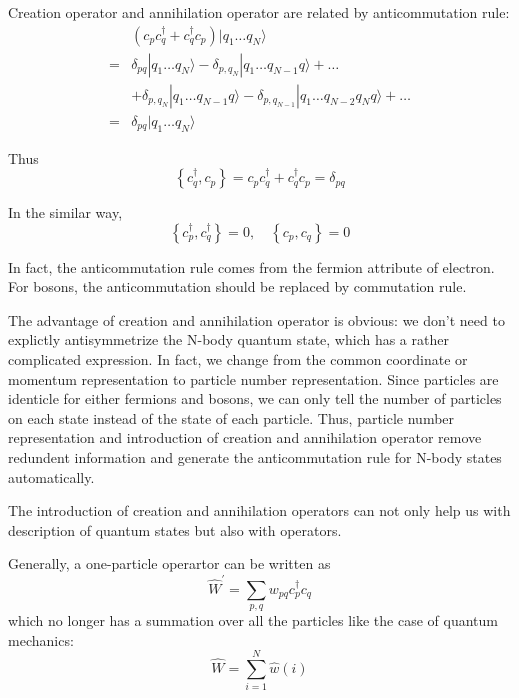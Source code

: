 Creation operator and annihilation operator are related by anticommutation rule:
\begin{equation}
\begin{aligned}
	&\left(c_{p} c_{q}^{\dagger}+c_{q}^{\dagger} c_{p}\right) | q_{1} \ldots q_{N} \rangle
	\\
	=&\delta_{p q} | q_{1} \ldots q_{N} \rangle-\delta_{p, q_{N}} | q_{1} \ldots q_{N-1} q \rangle+\ldots
	\\
	&+ \delta_{p, q_{N}} | q_{1} \ldots q_{N-1} q \rangle-\delta_{p, q_{N-1}} | q_{1} \ldots q_{N-2} q_{N} q \rangle+\ldots
	\\
	=&\delta_{p q} | q_{1} \ldots q_{N} \rangle
\end{aligned}
\end{equation}

Thus 
\begin{equation}
\left\{c_{q}^{\dagger}, c_{p}\right\}=c_{p} c_{q}^{\dagger}+c_{q}^{\dagger} c_{p}=\delta_{p q}
\end{equation}

In the similar way,
\begin{equation}
\left\{c_{p}^{\dagger}, c_{q}^{\dagger}\right\}=0, \quad\left\{c_{p}, c_{q}\right\}=0
\end{equation}

In fact, the anticommutation rule comes from the fermion attribute of electron.
For bosons, the anticommutation should be replaced by commutation rule.

The advantage of creation and annihilation operator is obvious: we don't need to explictly antisymmetrize the N-body quantum state, which has a rather complicated expression.
In fact, we change from the common coordinate or momentum representation to particle number representation.
Since particles are identicle for either fermions and bosons, we can only tell the number of particles on each state instead of the state of each particle.
Thus, particle number representation and introduction of creation and annihilation operator remove redundent information and generate the anticommutation rule for N-body states automatically.

The introduction of creation and annihilation operators can not only help us with description of quantum states but also with operators.

Generally, a one-particle operartor can be written as
\begin{equation}
\hat{W}^{\prime}=\sum_{p, q} w_{p q} c_{p}^{\dagger} c_{q}
\end{equation}
which no longer has a summation over all the particles like the case of quantum mechanics:
\begin{equation}
\hat{W}=\sum_{i=1}^{N} \hat{w}(i)
\end{equation}

